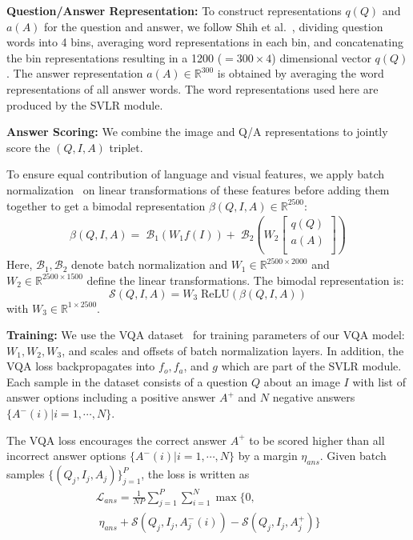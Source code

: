 \documentclass[10pt,twocolumn,letterpaper]{article}
\newcommand\boldhead[1]{\vspace{0.03in}\noindent\textbf{#1: }}
\begin{document}
\boldhead{Question/Answer Representation}  To construct representations $q(Q)$ and $a(A)$ for the question and answer, we follow Shih et al.~\cite{shih2016look}, dividing question words into 4 bins, averaging word representations in each bin, and concatenating the bin representations resulting in a 1200 ($=300\times4$) dimensional vector $q(Q)$. The answer representation $a(A)\in\mathbb{R}^{300}$ is obtained by averaging the word representations of all answer words. The word representations used here are produced by the SVLR module.

\boldhead{Answer Scoring} We combine the image and Q/A representations to jointly score the $(Q,I,A)$ triplet. %

To ensure equal contribution of language and visual features, we apply batch normalization~\cite{batchnorm} on linear transformations of these features before adding them together to get a bimodal representation $\beta(Q,I,A)\in\mathbb{R}^{2500}$:
\begin{multline}\label{eq:bimodal_pool}
\beta(Q,I,A) = \;\mathcal{B}_1(W_1f(I)) 
+ \;\mathcal{B}_2\left(W_2 
\begin{bmatrix}
q(Q) \\
a(A) \\
\end{bmatrix}
\right)
\end{multline}
Here, $\mathcal{B}_1,\mathcal{B}_2$ denote batch normalization and $W_1\in\mathbb{R}^{2500\times2000}$ and $W_2\in\mathbb{R}^{2500\times1500}$ define the linear transformations.
\noindent
The bimodal representation is: 
\begin{equation}
\mathcal{S}(Q,I,A) = W_3 \; \text{ReLU}(\beta(Q,I,A))
\end{equation}
with  ${W_3\in\mathbb{R}^{1\times2500}}$.


\boldhead{Training}\label{sec:vqa_learn}
We use the VQA dataset~\cite{antol2015vqa} for training parameters of our VQA model: $W_1, W_2, W_3$, and scales and offsets of batch normalization layers. In addition, the VQA loss backpropagates into $f_o, f_a$, and $g$ which are part of the SVLR module. Each sample in the dataset consists of a question $Q$ about an image $I$ with list of answer options including a positive answer $A^{+}$ and $N$ negative answers $\{A^{-}(i) | i=1,\cdots, N\}$. 

The VQA loss encourages the correct answer $A^{+}$ to be scored higher than all incorrect answer options $\{A^{-}(i) | i=1,\cdots, N\}$ by a margin $\eta_{ans}$. Given batch samples $\{(Q_j,I_j,A_j)\}_{j=1}^{P}$, the loss is written as 
\vspace{-2mm}
\begin{multline}
\mathcal{L}_{ans} = \frac{1}{NP}\sum_{j=1}^{P}
\sum_{i=1}^{N} \max\{0,\\\;\eta_{ans} + \mathcal{S}(Q_j,I_j,A_j^{-}(i)) - \mathcal{S}(Q_j,I_j,A_j^{+})\}
\end{multline}
\end{document}
